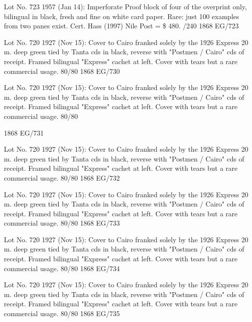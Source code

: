 \documentclass[justified]{tufte-book}
\begin{document}
%
{Lot No. 723
1957 (Jan 14): Imperforate Proof block of four of the overprint only, bilingual in black, fresh and fine on white card paper. Rare: just 100 examples from two panes exist. Cert. Hass (1997) Nile Post = \$ 480. /240 
}%
{1868}%
{EG/723}%
{}%
{}
{}%
{}







%
{Lot No. 720
1927 (Nov 15): Cover to Cairo franked solely by the 1926 Express 20 m. deep green tied by Tanta cds in black, reverse with "Postmen / Cairo" cds of receipt. Framed bilingual "Express" cachet at left. Cover with tears but a rare commercial usage. 80/80
}%
{1868}%
{EG/730}%
{}%
{}
{}%
{}


%
{Lot No. 720
1927 (Nov 15): Cover to Cairo franked solely by the 1926 Express 20 m. deep green tied by Tanta cds in black, reverse with "Postmen / Cairo" cds of receipt. Framed bilingual "Express" cachet at left. Cover with tears but a rare commercial usage. 80/80

}%
{1868}%
{EG/731}%
{}%
{}
{}%
{}

%
{Lot No. 720
1927 (Nov 15): Cover to Cairo franked solely by the 1926 Express 20 m. deep green tied by Tanta cds in black, reverse with "Postmen / Cairo" cds of receipt. Framed bilingual "Express" cachet at left. Cover with tears but a rare commercial usage. 80/80
}%
{1868}%
{EG/732}%
{}%
{}
{}%
{}

%
{Lot No. 720
1927 (Nov 15): Cover to Cairo franked solely by the 1926 Express 20 m. deep green tied by Tanta cds in black, reverse with "Postmen / Cairo" cds of receipt. Framed bilingual "Express" cachet at left. Cover with tears but a rare commercial usage. 80/80
}%
{1868}%
{EG/733}%
{}%
{}
{}%
{}


%
{Lot No. 720
1927 (Nov 15): Cover to Cairo franked solely by the 1926 Express 20 m. deep green tied by Tanta cds in black, reverse with "Postmen / Cairo" cds of receipt. Framed bilingual "Express" cachet at left. Cover with tears but a rare commercial usage. 80/80
}%
{1868}%
{EG/734}%
{}%
{}
{}%
{}

%
{Lot No. 720
1927 (Nov 15): Cover to Cairo franked solely by the 1926 Express 20 m. deep green tied by Tanta cds in black, reverse with "Postmen / Cairo" cds of receipt. Framed bilingual "Express" cachet at left. Cover with tears but a rare commercial usage. 80/80
}%
{1868}%
{EG/735}%
{}%
{}
{}%
{}
\end{document}

